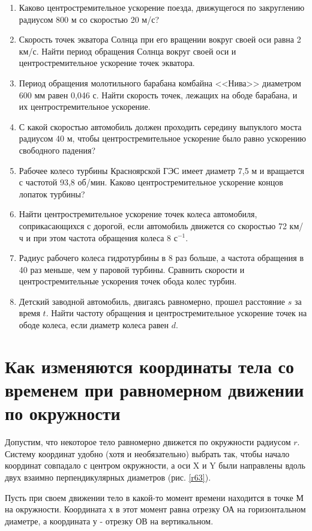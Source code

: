 \documentclass[a6paper, 11pt]{diss_4}
\renewcommand{\'}{\,'}
\begin{document}
\begin{enumerate}
\item Каково центростремительное ускорение поезда,  движущегося по закруглению радиусом 800 м со скоростью 20 м/с?
\item Скорость точек экватора Солнца при его вращении вокруг своей оси равна 2 км/с. Найти период обращения  Солнца вокруг своей оси и центростремительное ускорение точек экватора.
\item Период обращения молотильного барабана комбайна <<Нива>> диаметром 600 мм равен 0,046 с. Найти скорость точек, лежащих на ободе барабана, и их центростремительное ускорение.
\item С какой скоростью автомобиль должен проходить  середину выпуклого моста радиусом 40 м, чтобы  центростремительное ускорение было равно ускорению свободного  падения?
\item Рабочее колесо турбины Красноярской ГЭС имеет диаметр 7,5 м и вращается с частотой 93,8 об/мин. Каково центростремительное ускорение концов лопаток турбины?
\item Найти центростремительное ускорение точек колеса автомобиля, соприкасающихся с дорогой, если автомобиль движется со скоростью 72 км/ч и при этом частота обращения колеса 8 $с^{-1}$.
\item Радиус рабочего колеса гидротурбины в 8 раз  больше, а частота обращения в 40 раз меньше, чем у паровой  турбины. Сравнить скорости и центростремительные ускорения точек обода колес турбин.
\item Детский заводной автомобиль, двигаясь равномерно, прошел расстояние $s$ за время $t$. Найти частоту обращения и центростремительное ускорение точек на ободе колеса, если диаметр колеса равен $d$.
\end{enumerate}

\section{Как изменяются координаты тела со временем при равномерном движении по окружности}

  Допустим, что некоторое тело равномерно движется по окружности радиусом
$r$. Систему координат удобно (хотя и необязательно) выбрать так, чтобы начало
координат совпадало с центром окружности, а оси X и Y были направлены вдоль
двух взаимно перпендикулярных диаметров (рис. \ref{r63}).

  Пусть при своем движении тело в какой-то момент времени находится в
точке М на окружности. Координата х в этот момент равна отрезку ОА на
горизонтальном диаметре, а координата у - отрезку ОВ на вертикальном.
\end{document}
